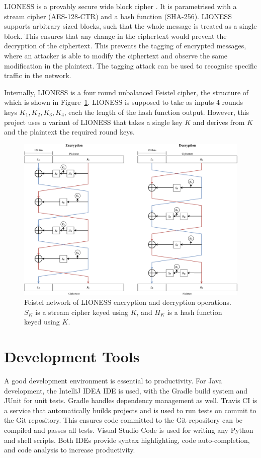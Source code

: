 \documentclass[final,dissertation.tex]{subfiles}
\begin{document}
LIONESS is a provably secure wide block cipher \cite{anderson1996two}. It is parametrised with a stream cipher (AES-128-CTR) and a hash function (SHA-256). LIONESS supports arbitrary sized blocks, such that the whole message is treated as a single block. This ensures that any change in the ciphertext would prevent the decryption of the ciphertext. This prevents the tagging of encrypted messages, where an attacker is able to modify the ciphertext and observe the same modification in the plaintext. The tagging attack can be used to recognise specific traffic in the network.

Internally, LIONESS is a four round unbalanced Feistel cipher, the structure of which is shown in Figure~\ref{fig:lioness_feistel}. LIONESS is supposed to take as inputs 4 rounds keys $K_1, K_2, K_3, K_4$, each the length of the hash function output. However, this project uses a variant of LIONESS that takes a single key $K$ and derives from $K$ and the plaintext the required round keys.

\begin{figure}[!h]
	\includegraphics[width=\linewidth]{../figs/lioness_feistel}
	\caption{Feistel network of LIONESS encryption and decryption operations. $S_K$ is a stream cipher keyed using $K$, and $H_K$ is a hash function keyed using $K$.}
	\label{fig:lioness_feistel}
\end{figure}

\section{Development Tools}

A good development environment is essential to productivity. For Java development, the IntelliJ IDEA IDE is used, with the Gradle build system and JUnit for unit tests. Gradle handles dependency management as well. Travis CI is a service that automatically builds projects and is used to run tests on commit to the Git repository. This ensures code committed to the Git repository can be compiled and passes all tests. Visual Studio Code is used for writing any Python and shell scripts. Both IDEs provide syntax highlighting, code auto-completion, and code analysis to increase productivity.
\end{document}
